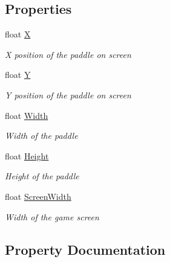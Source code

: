 \subsection*{Properties}
\begin{DoxyCompactItemize}
\item 
float \mbox{\hyperlink{class_bricks_1_1_paddle_a4d48a921475af13306f0596d42ae2dec}{X}}
\begin{DoxyCompactList}\small\item\em X position of the paddle on screen \end{DoxyCompactList}\item 
float \mbox{\hyperlink{class_bricks_1_1_paddle_a6dd6d381807daabe3c82e1f87ecb01bd}{Y}}
\begin{DoxyCompactList}\small\item\em Y position of the paddle on screen \end{DoxyCompactList}\item 
float \mbox{\hyperlink{class_bricks_1_1_paddle_a3e7ea0b22f6fe650f51cebe4e47017d7}{Width}}
\begin{DoxyCompactList}\small\item\em Width of the paddle \end{DoxyCompactList}\item 
float \mbox{\hyperlink{class_bricks_1_1_paddle_ac1f387c5f5d8ee6bfdd8039f3ac86e6c}{Height}}
\begin{DoxyCompactList}\small\item\em Height of the paddle \end{DoxyCompactList}\item 
float \mbox{\hyperlink{class_bricks_1_1_paddle_a53b9508baf7dacacc51e3ea4ab13b6aa}{Screen\+Width}}
\begin{DoxyCompactList}\small\item\em Width of the game screen \end{DoxyCompactList}\end{DoxyCompactItemize}


\subsection{Property Documentation}
\mbox{\label{class_bricks_1_1_paddle_ac1f387c5f5d8ee6bfdd8039f3ac86e6c}} 
